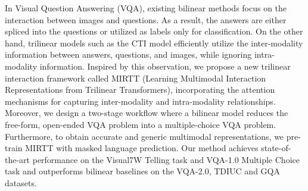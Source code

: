 In Visual Question Answering (VQA), existing bilinear methods focus on the interaction between images and questions. As a result, the answers are either spliced into the questions or utilized as labels only for classification. On the other hand, trilinear models such as the CTI model efficiently utilize the inter-modality information between answers, questions, and images, while ignoring intra-modality information. Inspired by this observation, we propose a new trilinear interaction framework called MIRTT (Learning Multimodal Interaction Representations from Trilinear Transformers), incorporating the attention mechanisms for capturing inter-modality and intra-modality relationships. Moreover, we design a two-stage workflow where a bilinear model reduces the free-form, open-ended VQA problem into a multiple-choice VQA problem. Furthermore, to obtain accurate and generic multimodal representations, we pre-train MIRTT with masked language prediction. Our method achieves state-of-the-art performance on the Visual7W Telling task and VQA-1.0 Multiple Choice task and outperforms bilinear baselines on the VQA-2.0, TDIUC and GQA datasets.
